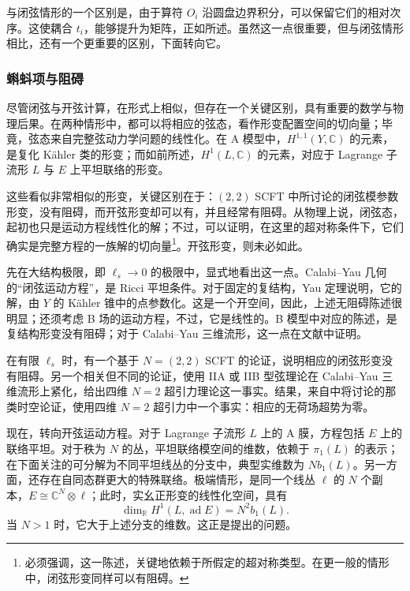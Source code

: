 与闭弦情形的一个区别是，由于算符 $O_i$ 沿圆盘边界积分，可以保留它们的相对次序。这使耦合 $t_i$，能够提升为矩阵，正如所述。虽然这一点很重要，但与闭弦情形相比，还有一个更重要的区别，下面转向它。

\subsubsection{蝌蚪项与阻碍}\label{sec:3.6.2.3}

尽管闭弦与开弦计算，在形式上相似，但存在一个关键区别，具有重要的数学与物理后果。在两种情形中，都可以将相应的弦态，看作形变配置空间的切向量；毕竟，弦态来自完整弦动力学问题的线性化。在 A 模型中，$H^{1,1}(Y,\mathbb{C})$ 的元素，是复化 K\"ahler 类的形变；而如前所述，$H^1(L,\mathbb{C})$ 的元素，对应于 Lagrange 子流形 $L$ 与 $E$ 上平坦联络的形变。

这些看似非常相似的形变，关键区别在于：$(2,2)$ SCFT 中所讨论的闭弦模参数形变，没有阻碍，而开弦形变却可以有，并且经常有阻碍。从物理上说，闭弦态，起初也只是运动方程线性化的解；不过，可以证明，在这里的超对称条件下，它们确实是完整方程的一族解的切向量\footnote{必须强调，这一陈述，关键地依赖于所假定的超对称类型。在更一般的情形中，闭弦形变同样可以有阻碍。}。开弦形变，则未必如此。

先在大结构极限，即 $\ell_s\to0$ 的极限中，显式地看出这一点。Calabi--Yau 几何的“闭弦运动方程”，是 Ricci 平坦条件。对于固定的复结构，Yau 定理说明，它的解，由 $Y$ 的 K\"ahler 锥中的点参数化。这是一个开空间，因此，上述无阻碍陈述很明显；还须考虑 B 场的运动方程，不过，它是线性的。B 模型中对应的陈述，是复结构形变没有阻碍；对于 Calabi--Yau 三维流形，这一点在文献中证明。

在有限 $\ell_s$ 时，有一个基于 $N=(2,2)$ SCFT 的论证，说明相应的闭弦形变没有阻碍。另一个相关但不同的论证，使用 IIA 或 IIB 型弦理论在 Calabi--Yau 三维流形上紧化，给出四维 $N=2$ 超引力理论这一事实。结果，来自中将讨论的那类时空论证，使用四维 $N=2$ 超引力中一个事实：相应的无荷场超势为零。

现在，转向开弦运动方程。对于 Lagrange 子流形 $L$ 上的 A 膜，方程包括 $E$ 上的联络平坦。对于秩为 $N$ 的丛，平坦联络模空间的维数，依赖于 $\pi_1(L)$ 的表示；在下面关注的可分解为不同平坦线丛的分支中，典型实维数为 $Nb_1(L)$。另一方面，还存在自同态群更大的特殊联络。极端情形，是同一个线丛 $\ell$ 的 $N$ 个副本，$E\cong\mathbb{C}^N\otimes\ell$；此时，实幺正形变的线性化空间，具有
\[
\dim_{\mathbb{R}}H^1(L,\operatorname{ad}E)=N^2b_1(L).
\]
当 $N>1$ 时，它大于上述分支的维数。这正是提出的问题。

